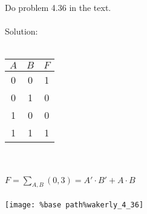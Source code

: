 Do problem 4.36 in the text.\\ \\

Solution: \\ \\
\begin{tabular}{cc|c}
  $A$ & $B$ & $F$ \\
  \hline
   0  &  0  &  1 \\
   0  &  1  &  0 \\
   1  &  0  &  0 \\
   1  &  1  &  1 \\
\end{tabular}\\ \\
$F=\sum_{A,B}(0,3)=A' \cdot B' + A \cdot B$\\ \\
\texttt{[image: \%base path\%wakerly\_4\_36]}\\
